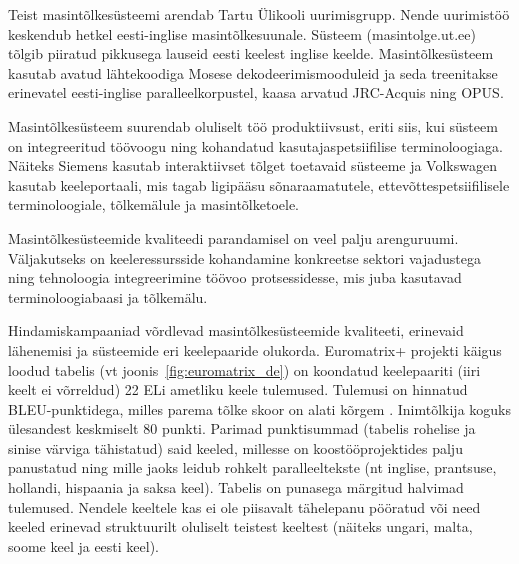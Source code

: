 \begin{multicols}{2}
Teist masintõlkesüsteemi arendab Tartu Ülikooli uurimisgrupp. 
Nende uurimistöö keskendub hetkel eesti-inglise masintõlkesuunale. 
Süsteem (masintolge.ut.ee) tõlgib piiratud pikkusega lauseid eesti keelest inglise keelde. 
Masintõlkesüsteem kasutab avatud lähtekoodiga Mosese dekodeerimismooduleid ja seda treenitakse erinevatel eesti-inglise paralleelkorpustel, kaasa arvatud JRC-Acquis ning OPUS. 

Masintõlkesüsteem suurendab oluliselt töö produktiivsust, eriti siis, kui süsteem on integreeritud töövoogu ning kohandatud kasutajaspetsiifilise terminoloogiaga. 
Näiteks Siemens kasutab interaktiivset tõlget toetavaid süsteeme ja Volkswagen kasutab keeleportaali, mis tagab ligipääsu sõnaraamatutele, ettevõttespetsiifilisele terminoloogiale, tõlkemälule ja masintõlketoele. 

Masintõlkesüsteemide kvaliteedi parandamisel on veel palju arenguruumi. 
Väljakutseks on keeleressursside kohandamine konkreetse sektori vajadustega ning tehnoloogia integreerimine töövoo protsessidesse, mis juba kasutavad terminoloogiabaasi ja tõlkemälu. 

Hindamiskampaaniad võrdlevad masintõlkesüsteemide kvaliteeti, erinevaid lähenemisi ja süsteemide eri keelepaaride olukorda. 
Euromatrix+ projekti käigus loodud tabelis (vt joonis~\ref{fig:euromatrix_de}) on koondatud keelepaariti (iiri keelt ei võrreldud) 22 ELi ametliku keele tulemused. 
Tulemusi on hinnatud BLEU-punktidega, milles parema tõlke skoor on alati kõrgem \cite{bleu1}. 
Inimtõlkija koguks ülesandest keskmiselt 80 punkti. 
Parimad punktisummad (tabelis rohelise ja sinise värviga tähistatud) said keeled, millesse on koostööprojektides palju panustatud ning mille jaoks leidub rohkelt paralleeltekste (nt inglise, prantsuse, hollandi, hispaania ja saksa keel). 
Tabelis on punasega märgitud halvimad tulemused. 
Nendele keeltele kas ei ole piisavalt tähelepanu pööratud või need keeled erinevad struktuurilt oluliselt teistest keeltest (näiteks ungari, malta, soome keel ja eesti keel). 


\end{multicols}
